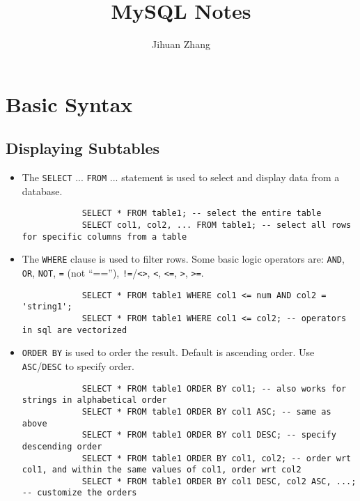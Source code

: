 \documentclass{article}
\title{\vspace*{-15mm} MySQL Notes}
\author{Jihuan Zhang}
\date{}
\begin{document}
\maketitle
\vspace{-15mm}
\section{Basic Syntax}
	\subsection{Displaying Subtables}
	
	\begin{itemize}
		\item The \texttt{\color{red}SELECT} ... \texttt{\color{red}FROM} ... statement is used to select and display data from a database.
		
		\begin{lstlisting}
			SELECT * FROM table1; -- select the entire table
			SELECT col1, col2, ... FROM table1; -- select all rows for specific columns from a table
		\end{lstlisting}
		
		\item The \texttt{\color{red}WHERE} clause is used to filter rows. Some basic logic operators are: \texttt{\color{red}AND}, \texttt{\color{red}OR}, \texttt{\color{red}NOT}, \texttt{\color{red}=} (not ``==''), \texttt{\color{red}!=}/\texttt{\color{red}<>}, \texttt{\color{red}<}, \texttt{\color{red}<=}, \texttt{\color{red}>}, \texttt{\color{red}>=}.
		
		\begin{lstlisting}
			SELECT * FROM table1 WHERE col1 <= num AND col2 = 'string1';
			SELECT * FROM table1 WHERE col1 <= col2; -- operators in sql are vectorized
		\end{lstlisting}
		
		\item \texttt{\color{red}ORDER BY} is used to order the result. Default is ascending order. Use \texttt{\color{red}ASC}/\texttt{\color{red}DESC}  to specify order.
		
		\begin{lstlisting}
			SELECT * FROM table1 ORDER BY col1; -- also works for strings in alphabetical order
			SELECT * FROM table1 ORDER BY col1 ASC; -- same as above
			SELECT * FROM table1 ORDER BY col1 DESC; -- specify descending order
			SELECT * FROM table1 ORDER BY col1, col2; -- order wrt col1, and within the same values of col1, order wrt col2
			SELECT * FROM table1 ORDER BY col1 DESC, col2 ASC, ...; -- customize the orders
		\end{lstlisting}
		

\end{itemize}
\end{document}
